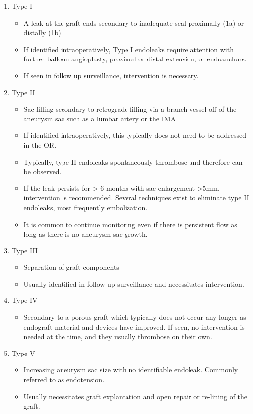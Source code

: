 \documentclass[
]{book}
\providecommand{\tightlist}{%
  \setlength{\itemsep}{0pt}\setlength{\parskip}{0pt}}
\begin{document}
\begin{enumerate}
\def\labelenumi{\arabic{enumi}.}
\item
  Type I

  \begin{itemize}
  \item
    A leak at the graft ends secondary to inadequate seal proximally
    (1a) or distally (1b)
  \item
    If identified intraoperatively, Type I endoleaks require
    attention with further balloon angioplasty, proximal or distal
    extension, or endoanchors.
  \item
    If seen in follow up surveillance, intervention is necessary.
  \end{itemize}
\item
  Type II

  \begin{itemize}
  \item
    Sac filling secondary to retrograde filling via a branch vessel
    off of the aneurysm sac such as a lumbar artery or the IMA
  \item
    If identified intraoperatively, this typically does not need to
    be addressed in the OR.
  \item
    Typically, type II endoleaks spontaneously thrombose and
    therefore can be observed.
  \item
    If the leak persists for \textgreater{} 6 months with sac enlargement \textgreater5mm,
    intervention is recommended. Several techniques exist to
    eliminate type II endoleaks, most frequently embolization.
  \item
    It is common to continue monitoring even if there is persistent
    flow as long as there is no aneurysm sac growth.
  \end{itemize}
\item
  Type III

  \begin{itemize}
  \item
    Separation of graft components
  \item
    Usually identified in follow-up surveillance and necessitates
    intervention.
  \end{itemize}
\item
  Type IV

  \begin{itemize}
  \tightlist
  \item
    Secondary to a porous graft which typically does not occur any
    longer as endograft material and devices have improved. If seen,
    no intervention is needed at the time, and they usually
    thrombose on their own.
  \end{itemize}
\item
  Type V

  \begin{itemize}
  \item
    Increasing aneurysm sac size with no identifiable endoleak.
    Commonly referred to as endotension.
  \item
    Usually necessitates graft explantation and open repair or
    re-lining of the graft.
  \end{itemize}
\end{enumerate}
\end{document}

